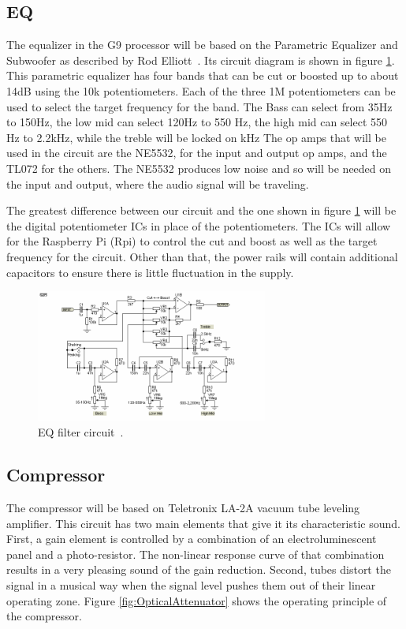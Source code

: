 \documentclass[journal]{IEEEtran}
\begin{document}
	\subsection{EQ}
	The equalizer in the G9 processor will be based on the Parametric Equalizer and Subwoofer as described by Rod Elliott~\cite{espEq}.  Its circuit diagram is shown in figure \ref{fig:eq}.  This parametric equalizer has four bands that can be cut or boosted up to about 14dB using the 10k potentiometers.  Each of the three 1M potentiometers can be used to select the target frequency for the band.  The Bass can select from 35Hz to 150Hz, the low mid can select 120Hz to 550 Hz, the high mid can select 550 Hz to 2.2kHz, while the treble will be locked on kHz  The op amps that will be used in the circuit are the NE5532, for the input and output op amps, and the TL072 for the others.  The NE5532 produces low noise and so will be needed on the input and output, where the audio signal will be traveling.
	
	The greatest difference between our circuit and the one shown in figure \ref{fig:eq} will be the digital potentiometer ICs in place of the potentiometers.  The ICs will allow for the Raspberry Pi (Rpi) to control the cut and boost as well as the target frequency for the circuit.  Other than that, the power rails will contain additional capacitors to ensure there is little fluctuation in the supply.
	
	
	
	\begin{figure}
		\centering
		\includegraphics[width=3in]{eq}
		\caption{EQ filter circuit~\cite{espEq}. }
		\label{fig:eq}
	\end{figure}
	
	\subsection{Compressor}
	The compressor will be based on Teletronix LA-2A vacuum tube leveling amplifier. This circuit has two main elements that give it its characteristic sound. First, a gain element is controlled by a combination of an electroluminescent panel and a photo-resistor. The non-linear response curve of that combination results in a very pleasing sound of the gain reduction.  Second, tubes distort the signal in a musical way when the signal level pushes them out of their linear operating zone. Figure \ref{fig:OpticalAttenuator} shows the operating principle of the compressor.
	
\end{document}

